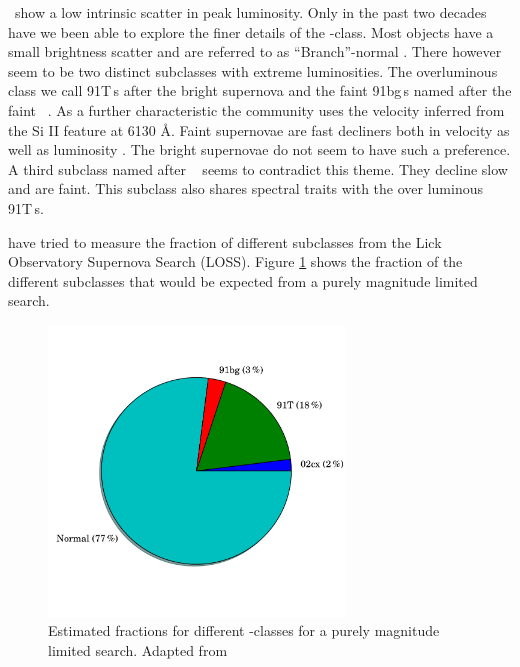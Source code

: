 \sneia\ show a low intrinsic scatter in peak luminosity. Only in the past two decades have we been able to explore the finer details of the \sneia-class.
Most objects have a small brightness scatter and are referred to as ``Branch''-normal \citep{1993AJ....106.2383B}. 
There however seem to be two distinct subclasses with extreme luminosities. The overluminous class we call 91T\,s after the bright supernova  \citet{1992AJ....103.1632P, 1994ApJ...434L..19S} and the faint 91bg\,s named after the faint \ \citep{1992AJ....104.1543F}. As a further characteristic the community uses the velocity inferred from the Si II feature at 6130 \AA.
Faint supernovae are fast decliners both in velocity as well as luminosity \citet{2005ApJ...623.1011B}. The bright supernovae do not seem to have such a preference. 
A third subclass named after \ \citep{2003PASP..115..453L} seems to contradict this theme. They decline slow and are faint. This subclass also shares spectral traits with the over luminous 91T\,s.

\citet{2011MNRAS.412.1441L} have tried to measure the fraction of different subclasses from the Lick Observatory Supernova Search (LOSS). Figure \ref{fig:ia_fracs} shows the fraction of the different subclasses that would be expected from a purely magnitude limited search. 

\begin{figure}[htbp] %
   \centering
   \includegraphics[width=0.7\textwidth, trim=0 2.5cm 0 0cm]{chapter_intro/plots/plot_ia_fracs.pdf} 
   \caption{Estimated fractions for different -classes for a purely magnitude limited search. Adapted from \citet{2011MNRAS.412.1441L}}
   \label{fig:ia_fracs}
\end{figure}

